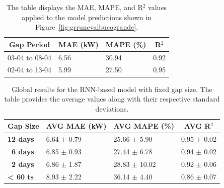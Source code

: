 \begin{table}[H]
	\begin{center}
		\begin{tabular}[c]{l|l|l|l}
			\multicolumn{1}{c|}{\textbf{Gap Period}} &
			\multicolumn{1}{c|}{\textbf{MAE (kW)}}   &
			\multicolumn{1}{c|}{\textbf{MAPE (\%)}}  &
			\multicolumn{1}{c}{\textbf{R}$^2$}                             \\
			\hline

			03-04 to 08-04                           & 6.56 & 30.94 & 0.92 \\
			02-04 to 13-04                           & 5.99 & 27.50 & 0.95

		\end{tabular}
	\end{center}
	\caption{The table displays the MAE, MAPE, and R$^2$ values applied to the model predictions shown in Figure~\ref{fig:grrunevalbucogrande}.
	}\label{tab:grrunpmaerlungo}
\end{table}


\begin{table}[H]
	\centering
	\begin{tabular}{l|l|l|l}
		\multicolumn{1}{c|}{\textbf{Gap Size}}      &
		\multicolumn{1}{c|}{\textbf{AVG MAE (kW)}}  &
		\multicolumn{1}{c|}{\textbf{AVG MAPE (\%)}} &
		\multicolumn{1}{c}{\textbf{AVG R$^2$}}                                                              \\
		\hline
		\textbf{12 days}                            & 6.64 $\pm$ 0.79 & 25.66 $\pm$ 5.90  & 0.95 $\pm$ 0.02 \\
		\textbf{\ 6 days}                           & 6.85 $\pm$ 0.93 & 27.44  $\pm$ 6.78 & 0.94 $\pm$ 0.02 \\
		\textbf{\ 2 days}                           & 6.86 $\pm$ 1.87 & 28.83 $\pm$ 10.02 & 0.92 $\pm$ 0.06 \\
		\textbf{< 60 ts}                            & 8.93 $\pm$ 2.22 & 36.14 $\pm$ 4.40  & 0.86 $\pm$ 0.07
	\end{tabular}
	\caption{Global results for the RNN-based model with fixed gap size. The table provides the average values along with their respective standard deviations.}
	\label{tab:grrunglobalmetricsranging}
\end{table}




